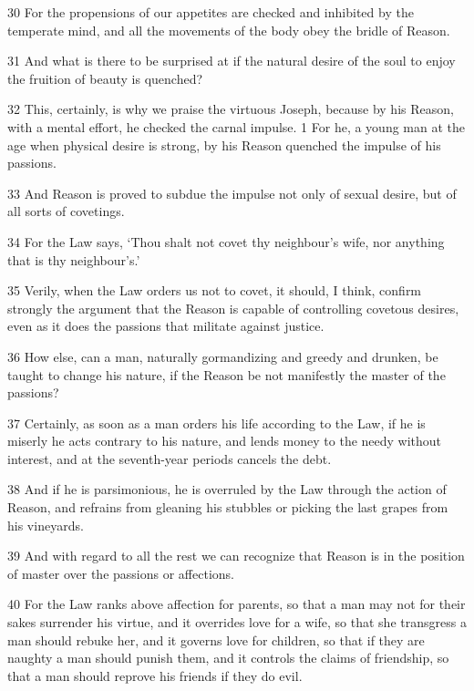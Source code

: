 \par 30 For the propensions of our appetites are checked and inhibited by the temperate mind, and all the movements of the body obey the bridle of Reason.

\par 31 And what is there to be surprised at if the natural desire of the soul to enjoy the fruition of beauty is quenched?

\par 32 This, certainly, is why we praise the virtuous Joseph, because by his Reason, with a mental effort, he checked the carnal impulse. 1 For he, a young man at the age when physical desire is strong, by his Reason quenched the impulse of his passions.

\par 33 And Reason is proved to subdue the impulse not only of sexual desire, but of all sorts of covetings.

\par 34 For the Law says, ‘Thou shalt not covet thy neighbour's wife, nor anything that is thy neighbour's.’

\par 35 Verily, when the Law orders us not to covet, it should, I think, confirm strongly the argument that the Reason is capable of controlling covetous desires, even as it does the passions that militate against justice.

\par 36 How else, can a man, naturally gormandizing and greedy and drunken, be taught to change his nature, if the Reason be not manifestly the master of the passions?

\par 37 Certainly, as soon as a man orders his life according to the Law, if he is miserly he acts contrary to his nature, and lends money to the needy without interest, and at the seventh-year periods cancels the debt.

\par 38 And if he is parsimonious, he is overruled by the Law through the action of Reason, and refrains from gleaning his stubbles or picking the last grapes from his vineyards.

\par 39 And with regard to all the rest we can recognize that Reason is in the position of master over the passions or affections.

\par 40 For the Law ranks above affection for parents, so that a man may not for their sakes surrender his virtue, and it overrides love for a wife, so that she transgress a man should rebuke her, and it governs love for children, so that if they are naughty a man should punish them, and it controls the claims of friendship, so that a man should reprove his friends if they do evil.

